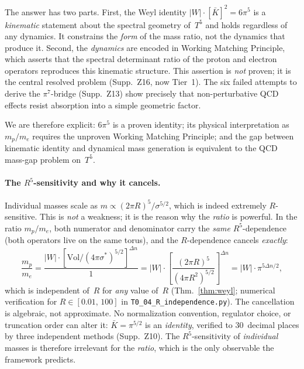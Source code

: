 \documentclass[11pt,a4paper]{article}
\theoremstyle{definition}
\theoremstyle{remark}
\begin{document}
The answer has two parts.  First, the Weyl identity
$|W|\cdot[\bar K]^2=6\pi^5$ is a \emph{kinematic} statement about
the spectral geometry of~$T^5$ and holds regardless of any dynamics.
It constrains the \emph{form} of the mass ratio, not the dynamics
that produce it.  Second, the \emph{dynamics} are encoded in Working
Matching Principle, which asserts that the spectral determinant ratio of
the proton and electron operators reproduces this kinematic
structure.  This assertion is \emph{not} proven; it is the central
resolved problem (Supp.~Z16, now Tier~1).  The six failed attempts to derive the
$\pi^7$-bridge (Supp.~Z13) show precisely that non-perturbative QCD
effects resist absorption into a simple geometric factor.

We are therefore explicit: $6\pi^5$ is a proven identity; its
physical interpretation as $m_p/m_e$ requires the unproven Working
Matching Principle; and the gap between kinematic identity and dynamical
mass generation is equivalent to the QCD mass-gap problem on~$T^5$.

\paragraph{The $R^5$-sensitivity and why it cancels.}
Individual masses scale as $m\propto (2\pi R)^5/\sigma^{5/2}$, which
is indeed extremely $R$-sensitive.  This is \emph{not} a weakness;
it is the reason why the \emph{ratio} is powerful.  In the ratio
$m_p/m_e$, both numerator and denominator carry the \emph{same}
$R^5$-dependence (both operators live on the same torus), and the
$R$-dependence cancels \emph{exactly}:
\begin{equation}\label{eq:Rcancel}
  \frac{m_p}{m_e}
  = \frac{|W|\cdot[\mathrm{Vol}/(4\pi\sigma^*)^{5/2}]^{\Delta n}}
         {1}
  = |W|\cdot\left[\frac{(2\pi R)^5}{(4\pi R^2)^{5/2}}\right]^{\Delta n}
  = |W|\cdot\pi^{5\Delta n/2},
\end{equation}
which is independent of~$R$ for \emph{any} value of~$R$
(Thm.~\ref{thm:weyl}; numerical verification for $R\in[0.01,\,100]$
in \texttt{T0\_04\_R\_independence.py}).  The cancellation is algebraic,
not approximate.  No normalization convention, regulator choice, or
truncation order can alter it: $\bar K=\pi^{5/2}$ is an
\emph{identity}, verified to 30~decimal places by three independent
methods (Supp.~Z10).  The $R^5$-sensitivity of \emph{individual}
masses is therefore irrelevant for the \emph{ratio}, which is the
only observable the framework predicts.
\end{document}
